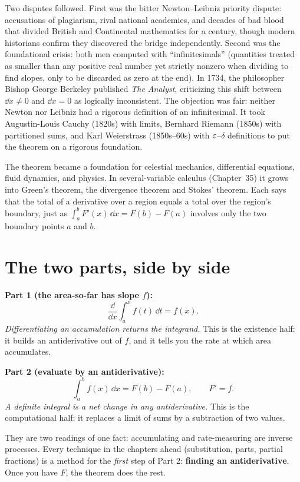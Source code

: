 \begin{historybox}
Two disputes followed. First was the bitter Newton--Leibniz priority
dispute: accusations of plagiarism, rival national academies, and decades of bad
blood that divided British and Continental mathematics for a century, though
modern historians confirm they discovered the bridge independently. Second was
the foundational crisis: both men computed with ``infinitesimals'' (quantities
treated as smaller than any positive real number yet strictly nonzero when
dividing to find slopes, only to be discarded as zero at the end). In 1734, the
philosopher Bishop George Berkeley published \emph{The Analyst}, criticizing this
shift between $\dd x \neq 0$ and $\dd x = 0$ as logically inconsistent. The objection
was fair: neither Newton nor Leibniz had a rigorous definition of an infinitesimal. It took Augustin-Louis Cauchy (1820s) with limits, Bernhard Riemann (1850s)
with partitioned sums, and Karl Weierstrass (1850s--60s) with $\varepsilon$--$\delta$
definitions to put the theorem on a rigorous foundation.

The theorem became a foundation for celestial mechanics, differential
equations, fluid dynamics, and physics. In several-variable calculus
(Chapter~35) it grows into Green's theorem, the divergence theorem and Stokes'
theorem. Each says that the total of a derivative over a region equals a total
over the region's boundary, just as $\int_a^b F'(x)\,\dd x = F(b)-F(a)$ involves
only the two boundary points $a$ and $b$.
\end{historybox}

\section{The two parts, side by side}

\begin{focusbox}
\textbf{Part 1 (the area-so-far has slope $f$):}
\[
  \frac{\dd}{\dd x}\int_a^x f(t)\,\dd t = f(x).
\]
\emph{Differentiating an accumulation returns the integrand.} This is the
existence half: it builds an antiderivative out of $f$, and it tells you the rate
at which area accumulates.

\textbf{Part 2 (evaluate by an antiderivative):}
\[
  \int_a^b f(x)\,\dd x = F(b)-F(a), \qquad F'=f.
\]
\emph{A definite integral is a net change in any antiderivative.} This is the
computational half: it replaces a limit of sums by a subtraction of two values.

They are two readings of one fact: accumulating and rate-measuring are
inverse processes. Every technique in the chapters ahead (substitution, parts,
partial fractions) is a method for the \emph{first} step of Part 2:
\textbf{finding an antiderivative}. Once you have $F$, the theorem does the rest.
\end{focusbox}

